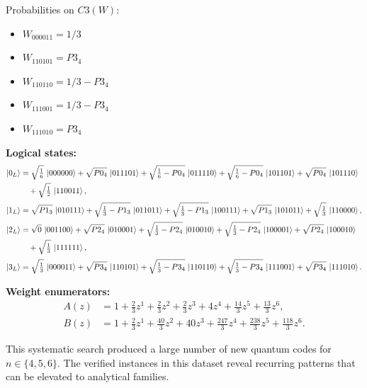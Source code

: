 \documentclass[11pt]{article}
\begin{document}
Probabilities on $C3 (W)$:
\begin{itemize}
    \item $W_{000011} = 1/3$
    \item $W_{110101} = P3_4$
    \item $W_{110110} = 1/3 - P3_4$
    \item $W_{111001} = 1/3 - P3_4$
    \item $W_{111010} = P3_4$
\end{itemize}

\noindent\textbf{Logical states:}
\begin{align*}
\ket{0_L} &= \sqrt{\tfrac{1}{6}}\,\ket{000000} + \sqrt{P0_4}\,\ket{011101} + \sqrt{\tfrac{1}{6} - P0_4}\,\ket{011110} + \sqrt{\tfrac{1}{6} - P0_4}\,\ket{101101} + \sqrt{P0_4}\,\ket{101110}\\
&\quad + \sqrt{\tfrac{1}{2}}\,\ket{110011},
\\[2pt]
\ket{1_L} &= \sqrt{P1_3}\,\ket{010111} + \sqrt{\tfrac{1}{3} - P1_3}\,\ket{011011} + \sqrt{\tfrac{1}{3} - P1_3}\,\ket{100111} + \sqrt{P1_3}\,\ket{101011} + \sqrt{\tfrac{1}{3}}\,\ket{110000},
\\[2pt]
\ket{2_L} &= \sqrt{0}\,\ket{001100} + \sqrt{P2_4}\,\ket{010001} + \sqrt{\tfrac{1}{3} - P2_4}\,\ket{010010} + \sqrt{\tfrac{1}{3} - P2_4}\,\ket{100001} + \sqrt{P2_4}\,\ket{100010}\\
&\quad + \sqrt{\tfrac{1}{3}}\,\ket{111111},
\\[2pt]
\ket{3_L} &= \sqrt{\tfrac{1}{3}}\,\ket{000011} + \sqrt{P3_4}\,\ket{110101} + \sqrt{\tfrac{1}{3} - P3_4}\,\ket{110110} + \sqrt{\tfrac{1}{3} - P3_4}\,\ket{111001} + \sqrt{P3_4}\,\ket{111010}.
\end{align*}

\noindent\textbf{Weight enumerators:}
\begin{align*}
A(z) &= 1 + \tfrac{2}{3}z^{1} + \tfrac{2}{3}z^{2} + \tfrac{2}{3}z^{3} + 4z^{4} + \tfrac{14}{3}z^{5} + \tfrac{13}{3}z^{6},\\[2pt]
B(z) &= 1 + \tfrac{2}{3}z^{1} + \tfrac{40}{3}z^{2} + 40z^{3} + \tfrac{247}{3}z^{4} + \tfrac{238}{3}z^{5} + \tfrac{118}{3}z^{6}.
\end{align*}

This systematic search produced a large number of new quantum codes for $n \in \{4, 5, 6\}$. The verified instances in this dataset reveal recurring patterns that can be elevated to analytical families.
\end{document}
